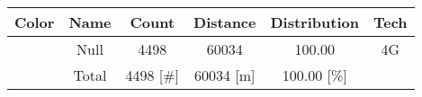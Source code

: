 \begin{longtable*}{|c|c|c|c|c|c|}\hline
{}
Color&Name&Count&Distance&Distribution&Tech\\\hline\hline
{} &Null&4498&60034&100.00&4G\\\hline
{} &Total&4498 [\#]&60034 [m]&100.00 [\%]&\\\hline
\end{longtable*}
